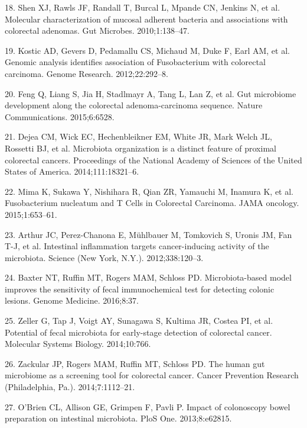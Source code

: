 \documentclass[12pt,]{article}
\begin{document}
\hypertarget{ref-shen_molecular_2010}{}
18. Shen XJ, Rawls JF, Randall T, Burcal L, Mpande CN, Jenkins N, et al.
Molecular characterization of mucosal adherent bacteria and associations
with colorectal adenomas. Gut Microbes. 2010;1:138--47.

\hypertarget{ref-kostic_genomic_2012}{}
19. Kostic AD, Gevers D, Pedamallu CS, Michaud M, Duke F, Earl AM, et
al. Genomic analysis identifies association of Fusobacterium with
colorectal carcinoma. Genome Research. 2012;22:292--8.

\hypertarget{ref-feng_gut_2015}{}
20. Feng Q, Liang S, Jia H, Stadlmayr A, Tang L, Lan Z, et al. Gut
microbiome development along the colorectal adenoma-carcinoma sequence.
Nature Communications. 2015;6:6528.

\hypertarget{ref-dejea_microbiota_2014}{}
21. Dejea CM, Wick EC, Hechenbleikner EM, White JR, Mark Welch JL,
Rossetti BJ, et al. Microbiota organization is a distinct feature of
proximal colorectal cancers. Proceedings of the National Academy of
Sciences of the United States of America. 2014;111:18321--6.

\hypertarget{ref-mima_fusobacterium_2015}{}
22. Mima K, Sukawa Y, Nishihara R, Qian ZR, Yamauchi M, Inamura K, et
al. Fusobacterium nucleatum and T Cells in Colorectal Carcinoma. JAMA
oncology. 2015;1:653--61.

\hypertarget{ref-arthur_intestinal_2012}{}
23. Arthur JC, Perez-Chanona E, Mühlbauer M, Tomkovich S, Uronis JM, Fan
T-J, et al. Intestinal inflammation targets cancer-inducing activity of
the microbiota. Science (New York, N.Y.). 2012;338:120--3.

\hypertarget{ref-baxter_microbiota-based_2016}{}
24. Baxter NT, Ruffin MT, Rogers MAM, Schloss PD. Microbiota-based model
improves the sensitivity of fecal immunochemical test for detecting
colonic lesions. Genome Medicine. 2016;8:37.

\hypertarget{ref-zeller_potential_2014}{}
25. Zeller G, Tap J, Voigt AY, Sunagawa S, Kultima JR, Costea PI, et al.
Potential of fecal microbiota for early-stage detection of colorectal
cancer. Molecular Systems Biology. 2014;10:766.

\hypertarget{ref-zackular_human_2014}{}
26. Zackular JP, Rogers MAM, Ruffin MT, Schloss PD. The human gut
microbiome as a screening tool for colorectal cancer. Cancer Prevention
Research (Philadelphia, Pa.). 2014;7:1112--21.

\hypertarget{ref-obrien_impact_2013}{}
27. O'Brien CL, Allison GE, Grimpen F, Pavli P. Impact of colonoscopy
bowel preparation on intestinal microbiota. PloS One. 2013;8:e62815.
\end{document}
